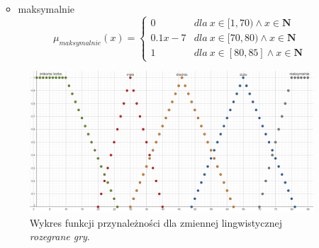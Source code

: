 \documentclass{classrep}
\begin{document}
\begin{enumerate}
\begin{itemize}
\begin{equation}
        \end{equation}
        \item maksymalnie
        \begin{equation}
            \mu_{maksymalnie}(x) = \left\{\begin{matrix} 0 & dla \: x\in [1, 70) \wedge x\in \mathbf{N} \\ 0.1x - 7 & dla \: x\in[70, 80) \wedge x\in \mathbf{N} \\ 1 & dla \: x\in [80, 85] \wedge x\in \mathbf{N} \end{matrix}\right.
        \end{equation}
    \end{itemize}
    \begin{figure}[H]
        \centering
        \includegraphics[width=14cm]{wykres_gry.png}
        \caption{Wykres funkcji przynależności dla zmiennej lingwistycznej \textit{rozegrane gry}.}
        \label{rysunek:gry}
    \end{figure}
    

\end{enumerate}
\end{document}
